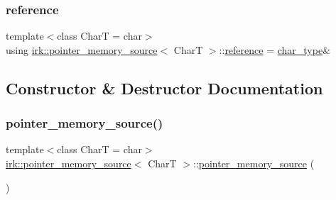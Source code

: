 \subsubsection{\texorpdfstring{reference}{reference}}
{\footnotesize\ttfamily template$<$class CharT  = char$>$ \\
using \mbox{\hyperlink{classirk_1_1pointer__memory__source}{irk\+::pointer\+\_\+memory\+\_\+source}}$<$ CharT $>$\+::\mbox{\hyperlink{classirk_1_1pointer__memory__source_a6dd95b7b51c414d4fe531ee7375ac071}{reference}} =  \mbox{\hyperlink{classirk_1_1pointer__memory__source_a4b778df8efee229fdafbd4de413dbf61}{char\+\_\+type}}\&}



\subsection{Constructor \& Destructor Documentation}
\mbox{\label{classirk_1_1pointer__memory__source_a30f9b1ac20116068b5e9daf8597f4f4b}} 
\subsubsection{\texorpdfstring{pointer\+\_\+memory\+\_\+source()}{pointer\_memory\_source()}\hspace{0.1cm}{\footnotesize\ttfamily [1/2]}}
{\footnotesize\ttfamily template$<$class CharT  = char$>$ \\
\mbox{\hyperlink{classirk_1_1pointer__memory__source}{irk\+::pointer\+\_\+memory\+\_\+source}}$<$ CharT $>$\+::\mbox{\hyperlink{classirk_1_1pointer__memory__source}{pointer\+\_\+memory\+\_\+source}} (\begin{DoxyParamCaption}{ }\end{DoxyParamCaption})\hspace{0.3cm}{\ttfamily [default]}}

\mbox{\label{classirk_1_1pointer__memory__source_a37313e3f5f00570dbe685b9dfe5053f4}} 
